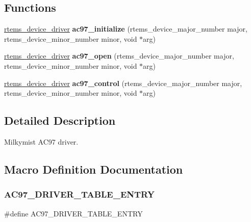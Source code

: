 \subsection*{Functions}
\begin{DoxyCompactItemize}
\item 
\mbox{\label{group__lm32__milkymist__ac97_gaac9e280d490ee22584fdcfcd35150318}} 
\mbox{\hyperlink{group__ClassicStatus_ga545d41846817eaba6143d52ee4d9e9fe}{rtems\+\_\+device\+\_\+driver}} {\bfseries ac97\+\_\+initialize} (rtems\+\_\+device\+\_\+major\+\_\+number major, rtems\+\_\+device\+\_\+minor\+\_\+number minor, void $\ast$arg)
\item 
\mbox{\label{group__lm32__milkymist__ac97_ga7d0cc1c7148784e59ec0a905d451fba0}} 
\mbox{\hyperlink{group__ClassicStatus_ga545d41846817eaba6143d52ee4d9e9fe}{rtems\+\_\+device\+\_\+driver}} {\bfseries ac97\+\_\+open} (rtems\+\_\+device\+\_\+major\+\_\+number major, rtems\+\_\+device\+\_\+minor\+\_\+number minor, void $\ast$arg)
\item 
\mbox{\label{group__lm32__milkymist__ac97_ga60125cfecedcd70632015f6a1136f02d}} 
\mbox{\hyperlink{group__ClassicStatus_ga545d41846817eaba6143d52ee4d9e9fe}{rtems\+\_\+device\+\_\+driver}} {\bfseries ac97\+\_\+control} (rtems\+\_\+device\+\_\+major\+\_\+number major, rtems\+\_\+device\+\_\+minor\+\_\+number minor, void $\ast$arg)
\end{DoxyCompactItemize}


\subsection{Detailed Description}
Milkymist A\+C97 driver. 



\subsection{Macro Definition Documentation}
\mbox{\label{group__lm32__milkymist__ac97_gac0cb713ad357c984b8275e3a39c348b2}} 
\subsubsection{\texorpdfstring{AC97\_DRIVER\_TABLE\_ENTRY}{AC97\_DRIVER\_TABLE\_ENTRY}}
{\footnotesize\ttfamily \#define A\+C97\+\_\+\+D\+R\+I\+V\+E\+R\+\_\+\+T\+A\+B\+L\+E\+\_\+\+E\+N\+T\+RY}

